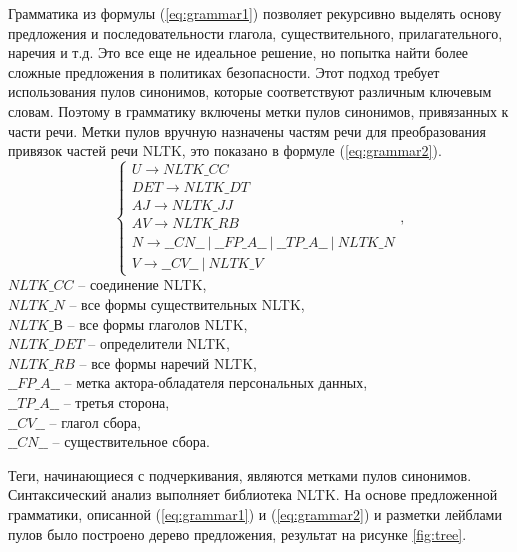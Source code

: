 \documentclass[../main]{subfiles}
\begin{document}
Грамматика из формулы (\ref{eq:grammar1}) позволяет рекурсивно выделять основу предложения и последовательности глагола, существительного, прилагательного, наречия и т.д. Это все еще не идеальное решение, но попытка найти более сложные предложения в политиках безопасности. Этот подход требует использования пулов синонимов, которые соответствуют различным ключевым словам. Поэтому в грамматику включены метки пулов синонимов, привязанных к части речи. Метки пулов вручную назначены частям речи для преобразования привязок частей речи NLTK, это показано в формуле (\ref{eq:grammar2}).
\begin{equation}
    \label{eq:grammar2}
    \left\{ 
        \begin{array}{l}
            U \rightarrow NLTK\_CC \\
            DET \rightarrow NLTK\_DT \\
            AJ \rightarrow NLTK\_JJ \\
            AV \rightarrow NLTK\_RB \\
            N \rightarrow \_\_CN\_\_\ |\ \_\_FP\_A\_\_\ |\ \_\_TP\_A\_\_\ |\ NLTK\_N \\
            V \rightarrow \_\_CV\_\_\ |\ NLTK\_V
        \end{array},
    \right. 
\end{equation}
$NLTK\_CC$ -- соединение NLTK,\\
\makebox[1.25cm]{}$NLTK\_N$ -- все формы существительных NLTK,\\
\makebox[1.25cm]{}$NLTK\_В$ -- все формы глаголов NLTK,\\
\makebox[1.25cm]{}$NLTK\_DET$ -- определители NLTK,\\
\makebox[1.25cm]{}$NLTK\_RB$ -- все формы наречий NLTK,\\
\makebox[1.25cm]{}$\_\_FP\_A\_\_$ -- метка актора-обладателя персональных данных,\\
\makebox[1.25cm]{}$\_\_TP\_A\_\_$ -- третья сторона,\\
\makebox[1.25cm]{}$\_\_CV\_\_$ -- глагол сбора,\\
\makebox[1.25cm]{}$\_\_CN\_\_$ -- существительное сбора.

Теги, начинающиеся с подчеркивания, являются метками пулов синонимов. Синтаксический анализ выполняет библиотека NLTK. На основе предложенной грамматики, описанной (\ref{eq:grammar1}) и (\ref{eq:grammar2}) и разметки лейблами пулов было построено дерево предложения, результат на рисунке \ref{fig:tree}.
\end{document}
